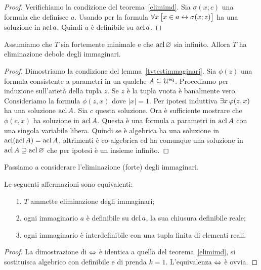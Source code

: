 \begin{proof}
Verifichiamo la condizione  del teorema~\ref{elimimd}. Sia $\sigma(x;c)$ una formula che definisce $a$. Usando  per la formula $\forall x\,\big[ x\in a\leftrightarrow\sigma(x;z)\big]$ ha una soluzione in $\mathop{\rm acl} a$. Quindi $a$ \`e definibile su $\mathop{\rm acl} a$.
\end{proof}

\begin{theorem}\label{elimimsm} 
Assumiamo che $T$ sia fortemente minimale e che $\mathop{\rm acl}\varnothing$ sia infinito. Allora $T$ ha eliminazione debole degli immaginari.
\end{theorem}

\begin{proof}
Dimostriamo la condizione  del lemma~\ref{tvtestimmaginari}. Sia $\phi(z)$ una formula consistente a parametri in un qualche $A\subseteq\EuScript U^{\rm eq}$. Procediamo per induzione sull'ariet\`a della tupla $z$. Se $z$ \`e la tupla vuota \`e banalmente vero. Consideriamo la formula $\phi(z,x)$ dove $|x|=1$. Per ipotesi induttiva $\exists x\,\varphi(z,x)$ ha una soluzione $\mathop{\rm acl} A$. Sia $c$ questa soluzione. Ora \`e sufficiente mostrare che $\phi(c,x)$ ha soluzione in $\mathop{\rm acl} A$. Questa \`e una formula a parametri in $\mathop{\rm acl} A$ con una singola variabile libera. Quindi se \`e algebrica ha una soluzione in $\mathop{\rm acl}(\mathop{\rm acl} A)=\mathop{\rm acl} A$, altrimenti \`e co-algebrica ed ha comunque una soluzione in $\mathop{\rm acl} A\supseteq\mathop{\rm acl}\varnothing$ che per ipotesi \`e un insieme infinito.
\end{proof}

Passiamo a considerare l'eliminazione (forte) degli immaginari.

\begin{theorem}\label{elimimf} 
Le seguenti affermazioni sono equivalenti:
\begin{itemize}
\item[1.] $T$ ammette eliminazione degli immaginari;
\item[2.] ogni immaginario $a$ \`e definibile su $\mathop{\rm dcl} a$, la sua chiusura definibile reale;
\item[3.] ogni immaginario \`e interdefinibile con una tupla finita di elementi reali.
\end{itemize}
\end{theorem}

\begin{proof}
La dimostrazione di $\Leftrightarrow$ \`e identica a quella del teorema~\ref{elimimd}, si sostituisca algebrico con definibile e di prenda $k=1$. L'equivalenza $\Leftrightarrow$ \`e ovvia.\end{proof}


